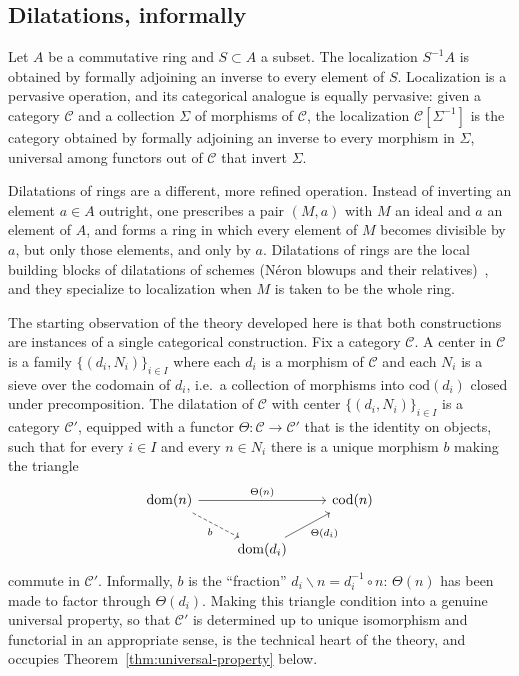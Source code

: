 \documentclass[11pt]{amsart}
\theoremstyle{plain}
\theoremstyle{definition}
\theoremstyle{remark}
\newcommand{\calC}{\mathcal C}
\newcommand{\dom}{\mathrm{dom}}
\newcommand{\cod}{\mathrm{cod}}
\begin{document}
\subsection{Dilatations, informally}

Let $A$ be a commutative ring and $S \subset A$ a subset. The localization $S^{-1}A$ is
obtained by formally adjoining an inverse to every element of $S$. Localization is a
pervasive operation, and its categorical analogue is equally pervasive: given a category
$\calC$ and a collection $\Sigma$ of morphisms of $\calC$, the localization $\calC[\Sigma^{-1}]$
is the category obtained by formally adjoining an inverse to every morphism in $\Sigma$,
universal among functors out of $\calC$ that invert $\Sigma$.

Dilatations of rings are a different, more refined operation. Instead of inverting an
element $a \in A$ outright, one prescribes a pair $(M,a)$ with $M$ an ideal and $a$ an
element of $A$, and forms a ring in which every element of $M$ becomes divisible by $a$,
but only those elements, and only by $a$. Dilatations of rings are
the local building blocks of dilatations of schemes (Néron blowups and their
relatives)~\citep{M,MRR,DMS}, and they specialize to localization when $M$ is taken to be the
whole ring.

The starting observation of the theory developed here is that both constructions are
instances of a single categorical construction. Fix a category $\calC$. A center in
$\calC$ is a family $\{(d_i, N_i)\}_{i \in I}$ where each $d_i$ is a morphism of $\calC$ and
each $N_i$ is a sieve over the codomain of $d_i$, i.e.\ a collection of morphisms
into $\cod(d_i)$ closed under precomposition. The dilatation of $\calC$ with center
$\{(d_i,N_i)\}_{i\in I}$ is a category $\calC'$, equipped with a functor
$\Theta : \calC \to \calC'$ that is the identity on objects, such that for every $i \in I$
and every $n \in N_i$ there is a unique morphism $b$ making the triangle
\begin{equation}
\label{eq:intro-triangle}
\begin{tikzcd}
\dom(n) \ar[rr, "\Theta(n)"] \ar[rd, dashed, "b"'] & & \cod(n) \\
& \dom(d_i) \ar[ru, "\Theta(d_i)"'] &
\end{tikzcd}
\end{equation}
commute in $\calC'$. Informally, $b$ is the ``fraction'' $d_i \backslash n = d_i^{-1}\circ n$:
$\Theta(n)$ has been made to factor through $\Theta(d_i)$. Making this triangle
condition into a genuine universal property, so that $\calC'$ is determined up to unique
isomorphism and functorial in an appropriate sense, is the technical heart of the theory,
and occupies Theorem~\ref{thm:universal-property} below.
\end{document}
